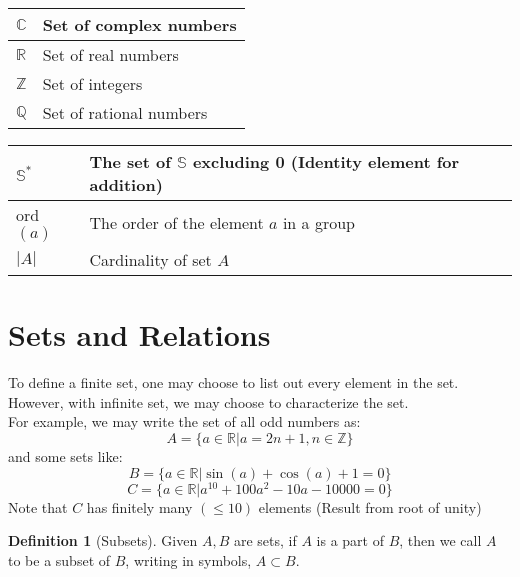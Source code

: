 \documentclass{article}
\theoremstyle{MyNonumberplain}
\theoremstyle{break}
\newcommand{\R}{\mathbb{R}}
\newcommand{\Q}{\mathbb{Q}}
\newcommand{\Z}{\mathbb{Z}}
\newcommand{\C}{\mathbb{C}}
\theoremstyle{break}
\theoremstyle{break}
\theoremstyle{definition}
\theoremstyle{break}
\newtheorem{definition}{Definition}[section]
\begin{document}
\begin{center}

    \begin{tabular}{|l|l|}
        \hline
        $\C$ & Set of complex numbers \\ \hline
        $\R$ & Set of real numbers \\ \hline
        $\Z$ & Set of integers \\ \hline
        $\Q$ & Set of rational numbers \\ \hline
    \end{tabular}
\end{center}
\begin{center}
    
    \begin{tabular}{|l|l|}
        \hline
        $\mathbb{S}^{*}$ & The set of $\mathbb{S}$ excluding 0 (Identity element for addition) \\ \hline
        ord$(a)$                                       & The order of the element $a$ in a group \\ \hline
        $|A|$                                          & Cardinality of set $A$ \\
        \hline                                                           
    \end{tabular}

\end{center}


\newpage

\tableofcontents

\newpage

\setcounter{section}{-1}

\section{Sets and Relations}

To define a finite set, one may choose to list out every element in the set.\\
However, with infinite set, we may choose to characterize the set.\\
For example, we may write the set of all odd numbers as:
        $$A=\{a\in\R|a=2n+1,n\in\Z\}$$
and some sets like:
        $$B=\{a\in\R|\sin(a)+\cos(a)+1=0\}$$
        $$C=\{a\in\R|a^{10}+100a^2-10a-10000=0\}$$
Note that $C$ has finitely many $(\leq 10)$ elements (Result from root of unity)

\begin{defbox}
    \begin{definition}[Subsets]
        Given $A, B$ are sets, if $A$ is a part of $B$, then we call $A$ to be a subset of $B$,
        writing in symbols, $A \subset B$.
    \end{definition}    
\end{defbox}
\end{document}
